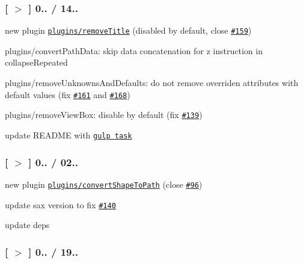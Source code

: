 \subsubsection*{\mbox{[} \href{https://github.com/svg/svgo/tree/v0.4.4}{\tt $>$} \mbox{]} 0.. / 14..}


\begin{DoxyItemize}
\item new plugin \href{https://github.com/svg/svgo/blob/master/plugins/removeTitle.js}{\tt plugins/remove\+Title} (disabled by default, close \href{https://github.com/svg/svgo/issues/159}{\tt \#159})
\item plugins/convert\+Path\+Data\+: skip data concatenation for z instruction in collapse\+Repeated
\item plugins/remove\+Unknowns\+And\+Defaults\+: do not remove overriden attributes with default values (fix \href{https://github.com/svg/svgo/issues/161}{\tt \#161} and \href{https://github.com/svg/svgo/issues/168}{\tt \#168})
\item plugins/remove\+View\+Box\+: disable by default (fix \href{https://github.com/svg/svgo/issues/139}{\tt \#139})
\item update R\+E\+A\+D\+ME with \href{https://github.com/ben-eb/gulp-svgmin}{\tt gulp task}
\end{DoxyItemize}

\subsubsection*{\mbox{[} \href{https://github.com/svg/svgo/tree/v0.4.3}{\tt $>$} \mbox{]} 0.. / 02..}


\begin{DoxyItemize}
\item new plugin \href{https://github.com/svg/svgo/blob/master/plugins/convertShapeToPath.js}{\tt plugins/convert\+Shape\+To\+Path} (close \href{https://github.com/svg/svgo/issues/96}{\tt \#96})
\item update sax version to fix \href{https://github.com/svg/svgo/issues/140}{\tt \#140}
\item update deps
\end{DoxyItemize}

\subsubsection*{\mbox{[} \href{https://github.com/svg/svgo/tree/v0.4.2}{\tt $>$} \mbox{]} 0.. / 19..}


